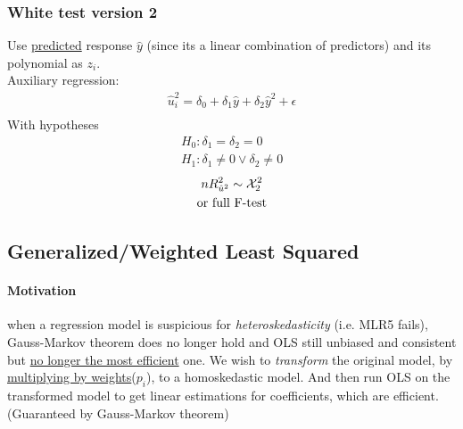 \documentclass[]{article}
\begin{document}
			\subsubsection{White test version 2}
				\par Use \ul{predicted} response $\hat{y}$ (since its a linear combination of predictors) and its polynomial as $z_i$. \\
				Auxiliary regression:
				\begin{gather*}
					\hat{u}_i^2 = \delta_0 + \delta_1 \hat{y} + \delta_2 \hat{y}^2 + \epsilon \\
				\end{gather*}
				With hypotheses
				\begin{gather*}
					H_0: \delta_1 = \delta_2 = 0\\
					H_1: \delta_1 \neq 0 \lor \delta_2 \neq 0
				\end{gather*}
				\begin{gather*}
					n R^2_{\hat{u}^2} \sim \mathcal{{X}}_2^2 \\
					\text{{or full F-test}}
				\end{gather*}
		\subsection{Generalized/Weighted Least Squared}
			\paragraph{Motivation} when a regression model is suspicious for \emph{heteroskedasticity} (i.e. MLR5 fails), Gauss-Markov theorem does no longer hold and OLS still unbiased and consistent but \ul{no longer the most efficient} one. We wish to \emph{transform} the original model, by \ul{multiplying by weights}($p_i$), to a homoskedastic model. And then run OLS on the transformed model to get linear estimations for coefficients, which are efficient. (Guaranteed by Gauss-Markov theorem)
			
\end{document}
